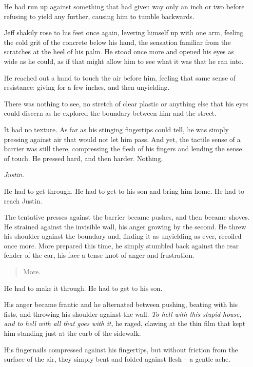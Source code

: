 He had run up against something that had given way only an inch or two before refusing to yield any further, causing him to tumble backwards.

Jeff shakily rose to his feet once again, levering himself up with one arm, feeling the cold grit of the concrete below his hand, the sensation familiar from the scratches at the heel of his palm.  He stood once more and opened his eyes as wide as he could, as if that might allow him to see what it was that he ran into.

He reached out a hand to touch the air before him, feeling that same sense of resistance: giving for a few inches, and then unyielding.

There was nothing to see, no stretch of clear plastic or anything else that his eyes could discern as he explored the boundary between him and the street.

It had no texture.  As far as his stinging fingertips could tell, he was simply pressing against air that would not let him pass.  And yet, the tactile sense of a barrier was still there, compressing the flesh of his fingers and lending the sense of touch.  He pressed hard, and then harder.  Nothing.

\textit{Justin.}

He had to get through.  He had to get to his son and bring him home.  He had to reach Justin.

The tentative presses against the barrier became pushes, and then became shoves.  He strained against the invisible wall, his anger growing by the second.  He threw his shoulder against the boundary and, finding it as unyielding as ever, recoiled once more.  More prepared this time, he simply stumbled back against the rear fender of the car, his face a tense knot of anger and frustration.

\begin{quote}
  More.
\end{quote}

He had to make it through.  He had to get to his son.

His anger became frantic and he alternated between pushing, beating with his fists, and throwing his shoulder against the wall.  \textit{To hell with this stupid house, and to hell with all that goes with it,} he raged, clawing at the thin film that kept him standing just at the curb of the sidewalk.

His fingernails compressed against his fingertips, but without friction from the surface of the air, they simply bent and folded against flesh -- a gentle ache.


